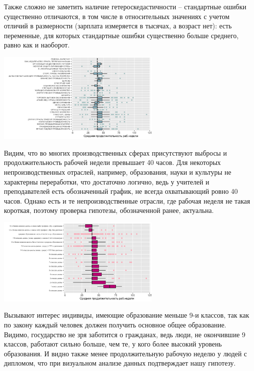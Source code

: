 \documentclass[12pt, a4paper]{article}
\begin{document}
{		Также сложно не заметить наличие гетероскедастичности – стандартные ошибки существенно отличаются, в том числе в относительных значениях с учетом отличий в размерности (зарплата измеряется в тысячах, а возраст нет): есть переменные, для которых стандартные ошибки существенно больше среднего, равно как и наоборот. 
		
		
		\begin{center}
			\includegraphics[width=0.6\textwidth]{step02_proposal/structure.png}
		\end{center}
		
		Видим, что во многих производственных сферах присутствуют выбросы и продолжительность рабочей недели превышает 40 часов. Для некоторых непроизводственных отраслей, например, образования, науки и культуры не характерны переработки, что достаточно логично, ведь у учителей и преподавателей есть обозначенный график, не всегда охватывающий ровно 40 часов. Однако есть и те непроизводственные отрасли, где рабочая неделя не такая короткая, поэтому проверка гипотезы, обозначенной ранее, актуальна.
		
		\begin{center}
			\includegraphics[width=0.6\textwidth]{step02_proposal/educ.png}
		\end{center}
		
		Вызывают интерес индивиды, имеющие образование меньше 9-и классов, так как по закону каждый человек должен получить основное общее образование. Видимо, государство не зря заботится о гражданах, ведь люди, не окончившие 9 классов, работают сильно больше, чем те, у кого более высокий уровень образования. И видно также менее продолжительную рабочую неделю у людей с дипломом, что при визуальном анализе данных подтверждает нашу гипотезу.
		
}
\end{document}
